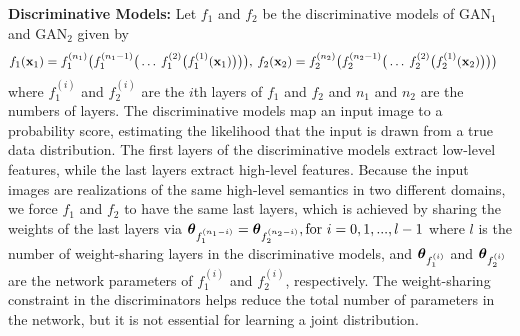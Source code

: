 {\bf Discriminative Models: }
Let $f_1$ and $f_2$ be the discriminative models of $\text{GAN}_1$ and $\text{GAN}_2$ given by
\begin{align}
& f_1(\mathbf{x}_1) = f_1^{(n_1)}\big{(}f_1^{(n_1-1)}\big{(}\ldots\medspace f_1^{(2)}\big{(}f_1^{(1)}(\mathbf{x}_1)\big{)}\big{)}\big{)},\medspace
f_2(\mathbf{x}_2) = f_2^{(n_2)}\big{(}f_2^{(n_2-1)}\big{(}\ldots\medspace f_2^{(2)}\big{(}f_2^{(1)}(\mathbf{x}_2)\big{)}\big{)}\big{)}\nonumber
\end{align}
where $f_1^{(i)}$ and $f_2^{(i)}$ are the $i$th layers of $f_1$ and $f_2$ and $n_1$ and $n_2$ are the numbers of layers. The discriminative models map an input image to a probability score, estimating the likelihood that the input is drawn from a true data distribution. The first layers of the discriminative models extract low-level features, while the last layers extract high-level features. Because the input images are realizations of the same high-level semantics in two different domains, we force $f_1$ and $f_2$ to have the same last layers, which is achieved by sharing the weights of the last layers via
$\text{\boldmath$\theta$}_{f_1^{(n_1-i)}}=\text{\boldmath$\theta$}_{f_2^{(n_2-i)}}, \text{for } i=0,1,...,l-1$
where $l$ is the number of weight-sharing layers in the discriminative models, and $\text{\boldmath$\theta$}_{f_1^{(i)}}$ and $\text{\boldmath$\theta$}_{f_2^{(i)}}$ are the network parameters of $f_1^{(i)}$ and $f_2^{(i)}$, respectively. The weight-sharing constraint in the discriminators helps reduce the total number of parameters in the network, but it is not essential for learning a joint distribution.

